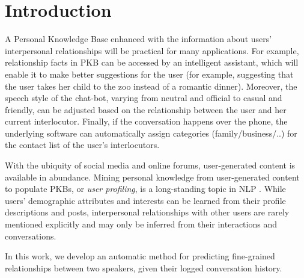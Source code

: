 \section{Introduction}

 A Personal Knowledge Base enhanced with the information about users' interpersonal relationships will be practical for many applications. For example, relationship facts in PKB can be accessed by an intelligent assistant, which will enable it to make better suggestions for the user (for example, suggesting that the user takes her child to the zoo instead of a romantic dinner). Moreover, the speech style of the chat-bot, varying from neutral and official to casual and friendly, can be adjusted based on the relationship between the user and her current interlocutor. Finally, if the conversation happens over the phone, the underlying software can automatically assign categories (family/business/..) for the contact list of the user's interlocutors.

With the ubiquity of social media and online forums, user-generated content is available in abundance. Mining personal knowledge from user-generated content to populate PKBs, or \emph{user profiling}, is a long-standing topic in NLP \cite[e.g.,][]{flekova:ACL16:long,basile:2017,tigunova2019listening}. While users' demographic attributes and interests can be learned from their profile descriptions and posts, interpersonal relationships with other users are rarely mentioned explicitly and may only be inferred from their interactions and conversations.

In this work, we develop an automatic method for predicting fine-grained relationships between two speakers, given their logged conversation history.

